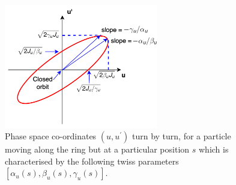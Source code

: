 \begin{figure}[!h] %
    \centering         
    \includegraphics[width=0.6\textwidth]{images/Ch2/phase_space_ellipse.png}
        \caption{Phase space co-ordinates $(u, u^\prime)$ turn by turn, for a particle moving along the ring but at a particular position $s$ which is characterised by the following twiss parameters $[\alpha_u(s), \beta_u(s), \gamma_u(s)]$.} %
        \label{fig:phase_space_ellipse}
 \end{figure}



